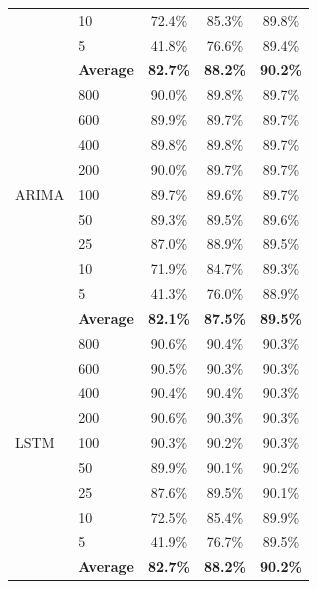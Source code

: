 \documentclass[11pt,a4paper]{article}
\begin{document}
\begin{table}[H]
\begin{tabular}{llccc}
 & 10  & 72.4\% & 85.3\% & 89.8\% \\
 & 5   & 41.8\% & 76.6\% & 89.4\% \\
 & \textbf{Average} & \textbf{82.7\%} & \textbf{88.2\%} & \textbf{90.2\%} \\
\midrule
\multirow{9}{*}{ARIMA}
 & 800 & 90.0\% & 89.8\% & 89.7\% \\
 & 600 & 89.9\% & 89.7\% & 89.7\% \\
 & 400 & 89.8\% & 89.8\% & 89.7\% \\
 & 200 & 90.0\% & 89.7\% & 89.7\% \\
 & 100 & 89.7\% & 89.6\% & 89.7\% \\
 & 50  & 89.3\% & 89.5\% & 89.6\% \\
 & 25  & 87.0\% & 88.9\% & 89.5\% \\
 & 10  & 71.9\% & 84.7\% & 89.3\% \\
 & 5   & 41.3\% & 76.0\% & 88.9\% \\
 & \textbf{Average} & \textbf{82.1\%} & \textbf{87.5\%} & \textbf{89.5\%} \\
\midrule
\multirow{9}{*}{LSTM}
 & 800 & 90.6\% & 90.4\% & 90.3\% \\
 & 600 & 90.5\% & 90.3\% & 90.3\% \\
 & 400 & 90.4\% & 90.4\% & 90.3\% \\
 & 200 & 90.6\% & 90.3\% & 90.3\% \\
 & 100 & 90.3\% & 90.2\% & 90.3\% \\
 & 50  & 89.9\% & 90.1\% & 90.2\% \\
 & 25  & 87.6\% & 89.5\% & 90.1\% \\
 & 10  & 72.5\% & 85.4\% & 89.9\% \\
 & 5   & 41.9\% & 76.7\% & 89.5\% \\
 & \textbf{Average} & \textbf{82.7\%} & \textbf{88.2\%} & \textbf{90.2\%} \\
\bottomrule
\end{tabular}
\end{table}
\end{document}

